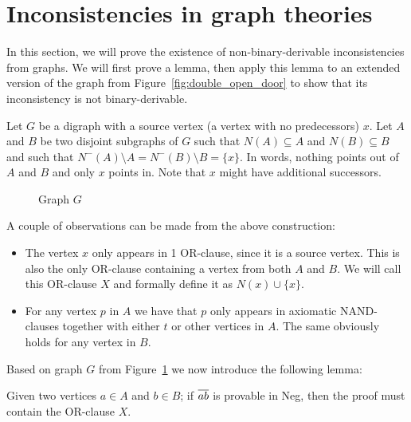 \section{Inconsistencies in graph theories}
\label{sec:Inconsistencies in graph theories}
In this section, we will prove the existence of non-binary-derivable inconsistencies from graphs.
We will first prove a lemma, then apply this lemma to an extended version of the graph from Figure~\ref{fig:double_open_door} to show that its inconsistency is not binary-derivable.

Let $G$ be a digraph with a source vertex (a vertex with no predecessors) $x$.
Let $A$ and $B$ be two disjoint subgraphs of $G$ such that $N(A) \subseteq A$ and $N(B) \subseteq B$ and such that $N^-(A) \setminus A = N^-(B) \setminus B = \{ x\}$.
In words, nothing points out of $A$ and $B$ and only $x$ points in.
Note that $x$ might have additional successors.\par
\begin{figure}[!h]
  \centering
  \caption{Graph $G$}
  \label{fig:components_link}
\end{figure}
A couple of observations can be made from the above construction:
\begin{itemize}
  \item The vertex $x$ only appears in 1 OR-clause, since it is a source vertex.
  This is also the only OR-clause containing a vertex from both $A$ and $B$.
  We will call this OR-clause $X$ and formally define it as $N(x) \cup \{ x\}$.
  \item For any vertex $p$ in $A$ we have that $p$ only appears in axiomatic NAND-clauses together with either $t$ or other vertices in $A$.
  The same obviously holds for any vertex in $B$.
\end{itemize}
Based on graph $G$ from Figure~\ref{fig:components_link} we now introduce the following lemma:
\begin{lemma}
  Given two vertices $a \in A$ and $b \in B$; if $\ol{ab}$ is provable in Neg, then the proof must contain the OR-clause $X$.
  \label{thm:or_clause_lemma}
\end{lemma}
